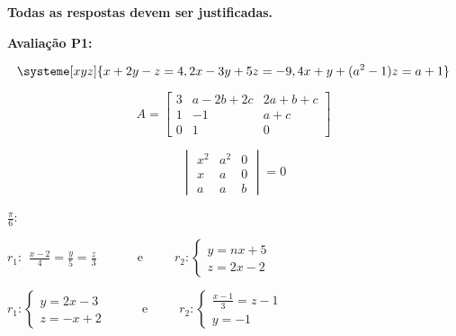 \documentclass{prova}
\newcommand{\ds}{\displaystyle}
\begin{document}

    \textbf{Todas as respostas devem ser justificadas.}
    \vspace{0.5cm}

    \textbf{Avalia\c{c}\~ao P1:}
    \vspace{-0.5cm}

    \begin{questionario}
            \[\systeme[xyz]{
                x + 2y - z = 4,
                2x - 3y + 5z = -9,
                4x + y + {(a^2-1)}z = a+1
            }\]
        \vspace{-1cm}

            \[A = \begin{bmatrix}
                3 & a-2b+2c & 2a+b+c \\
                1 & -1 & a+c \\
                0 & 1 & 0
            \end{bmatrix}\]
        \vspace{-1cm}

            \[\begin{vmatrix}
                x^2 & a^2 & 0 \\
                x & a & 0 \\
                a & a & b
            \end{vmatrix}=0\]
        \vspace{-1cm}

            $\frac{\pi}{6}$:

            $r_1:\begin{array}{l}
                \ds\frac{x-2}{4} = \frac{y}{5} = \frac{z}{3}
            \end{array}$
            \ \ \ \ \ e\ \ \ \ \ 
            $r_2:\left\{\begin{array}{l}
                y = nx + 5 \\
                z = 2x - 2
            \end{array}\right.$

            $r_1:\left\{\begin{array}{l}
                y = 2x - 3 \\
                z = -x + 2
            \end{array}\right.$
            \ \ \ \ \ e\ \ \ \ \ 
            $r_2:\left\{\begin{array}{l}
                \frac{x-1}{3} = z-1 \\
                y = -1
            \end{array}\right.$
    \end{questionario}
    \vspace{0.5cm}
\end{document}
